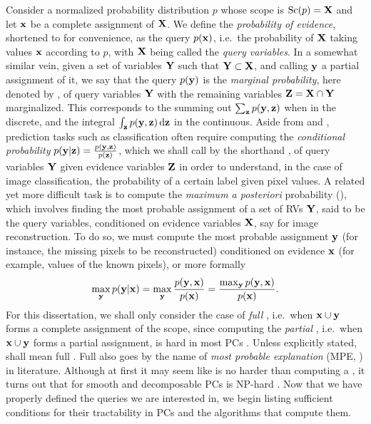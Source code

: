 Consider a normalized probability distribution $p$ whose scope is $\operatorname*{\normalfont{Sc}}(p)=\mathbf{X}$ and let
$\mathbf{x}$ be a complete assignment of $\mathbf{X}$. We define the \emph{probability of evidence},
shortened to \evi{} for convenience, as the query $p(\mathbf{x})$, i.e.\ the probability of $\mathbf{X}$
taking values $\mathbf{x}$ according to $p$, with $\mathbf{X}$ being called the \emph{query variables}.
In a somewhat similar vein, given a set of variables $\mathbf{Y}$ such that $\mathbf{Y}\subset\mathbf{X}$,
and calling $\mathbf{y}$ a partial assignment of it, we say that the query $p(\mathbf{y})$ is the
\emph{marginal probability}, here denoted by \mar{}, of query variables $\mathbf{Y}$ with the
remaining variables $\mathbf{Z}=\mathbf{X}\cap \mathbf{Y}$ marginalized. This corresponds to the summing out
$\sum_{\mathbf{z}}p(\mathbf{y}, \mathbf{z})$ when in the discrete, and the integral
$\int_{\mathbf{z}}p(\mathbf{y},\mathbf{z})\mathop{}\!\mathrm{d}\mathbf{z}$ in the continuous. Aside from \evi{} and \mar{},
prediction tasks such as classification often require computing the \emph{conditional probability}
$p(\mathbf{y}|\mathbf{z})=\frac{p(\mathbf{y},\mathbf{z})}{p(\mathbf{z})}$, which we shall call by the shorthand
\con{}, of query variables $\mathbf{Y}$ given evidence variables $\mathbf{Z}$ in order to understand, in
the case of image classification, the probability of a certain label given pixel values. A related
yet more difficult task is to compute the \emph{maximum a posteriori} probability (\map{}), which
involves finding the most probable assignment of a set of RVs $\mathbf{Y}$, said to be the query
variables, conditioned on evidence variables $\mathbf{X}$, say for image reconstruction. To do so, we
must compute the most probable assignment $\mathbf{y}$ (for instance, the missing pixels to be
reconstructed) conditioned on evidence $\mathbf{x}$ (for example, values of the known pixels), or more
formally
\begin{equation}
  \max_{\mathbf{y}}p(\mathbf{y}|\mathbf{x})=\max_{\mathbf{y}}\frac{p(\mathbf{y},\mathbf{x})}{p(\mathbf{x})}=
  \frac{\max_{\mathbf{y}}p(\mathbf{y},\mathbf{x})}{p(\mathbf{x})}.
  \label{eq:map}
\end{equation}
For this dissertation, we shall only consider the case of \emph{full} \map{}, i.e.\ when
$\mathbf{x}\cup\mathbf{y}$ forms a complete assignment of the scope, since computing the \emph{partial}
\map{}, i.e.\ when $\mathbf{x}\cup\mathbf{y}$ forms a partial assignment, is hard in most PCs
\citep{peharz16,decampos11}. Unless explicitly stated, \map{} shall mean full \map{}. Full \map{}
also goes by the name of \emph{most probable explanation} (MPE, \cite{darwiche09}) in literature.
Although at first it may seem like \map{} is no harder than computing a \con{}, it turns out that
for smooth and decomposable PCs \map{} is NP-hard \citep{conaty17,mei18}. Now that we have properly
defined the queries we are interested in, we begin listing sufficient conditions for their
tractability in PCs and the algorithms that compute them.

